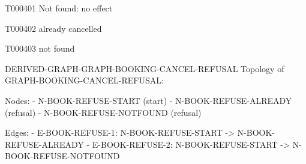 \documentclass[11pt,a4paper]{article}
\begin{document}
\begin{atlastext}{T000401}
Not found: no effect
\end{atlastext}
\begin{atlastext}{T000402}
already cancelled
\end{atlastext}
\begin{atlastext}{T000403}
not found
\end{atlastext}
\par\noindent\begin{minipage}{\linewidth}
\begin{atlasderived}{DERIVED-GRAPH-GRAPH-BOOKING-CANCEL-REFUSAL}
Topology of GRAPH-BOOKING-CANCEL-REFUSAL:

Nodes:
- N-BOOK-REFUSE-START (start)
- N-BOOK-REFUSE-ALREADY (refusal)
- N-BOOK-REFUSE-NOTFOUND (refusal)

Edges:
- E-BOOK-REFUSE-1: N-BOOK-REFUSE-START -> N-BOOK-REFUSE-ALREADY
- E-BOOK-REFUSE-2: N-BOOK-REFUSE-START -> N-BOOK-REFUSE-NOTFOUND
\end{atlasderived}
\end{minipage}\par
\clearpage
{}\par
{}\par
\end{document}
